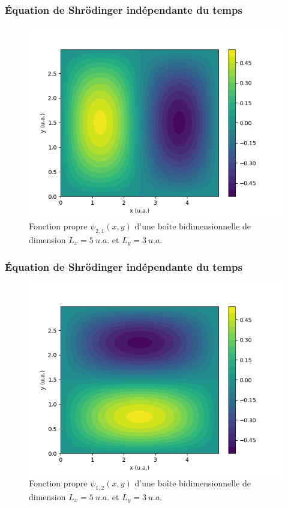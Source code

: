 \documentclass{beamer}
\begin{document}
\begin{frame}
\frametitle{Équation de Shrödinger indépendante du temps}
\begin{figure}[h]
\includegraphics[scale=0.5]{fct_propre2d_21}
\caption{Fonction propre $\psi_{2,1}(x,y)$ d'une boîte bidimensionnelle de dimension $L_x=5\ u.a.$ et $L_y=3\ u.a.$}
\end{figure}
\end{frame}


\begin{frame}
\frametitle{Équation de Shrödinger indépendante du temps}
\begin{figure}[h]
\includegraphics[scale=0.5]{fct_propre2d_12}
\caption{Fonction propre $\psi_{1,2}(x,y)$ d'une boîte bidimensionnelle de dimension $L_x=5\ u.a.$ et $L_y=3\ u.a.$}
\end{figure}
\end{frame}
\end{document}

